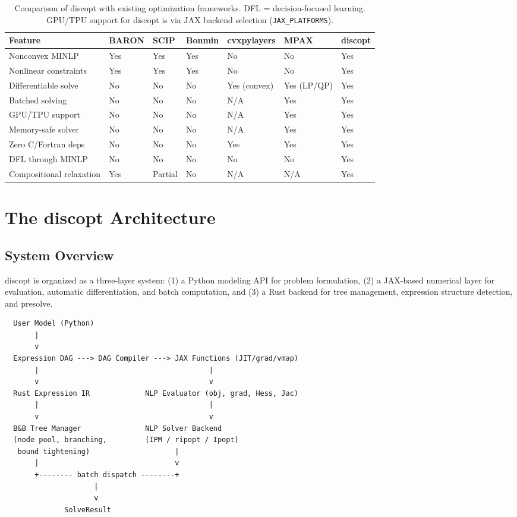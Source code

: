 \documentclass[12pt,preprint]{article}
\begin{document}
\begin{table}[htbp]
\centering
\begin{tabular}{lllllll}
\toprule
Feature & BARON & SCIP & Bonmin & cvxpylayers & MPAX & discopt \\
\midrule
Nonconvex MINLP & Yes & Yes & Yes & No & No & Yes \\
Nonlinear constraints & Yes & Yes & Yes & No & No & Yes \\
Differentiable solve & No & No & No & Yes (convex) & Yes (LP/QP) & Yes \\
Batched solving & No & No & No & N/A & Yes & Yes \\
GPU/TPU support & No & No & No & N/A & Yes & Yes \\
Memory-safe solver & No & No & No & N/A & Yes & Yes \\
Zero C/Fortran deps & No & No & No & Yes & Yes & Yes \\
DFL through MINLP & No & No & No & No & No & Yes \\
Compositional relaxation & Yes & Partial & No & N/A & N/A & Yes \\
\bottomrule
\end{tabular}
\caption{Comparison of discopt with existing optimization frameworks. DFL = decision-focused learning. GPU/TPU support for discopt is via JAX backend selection (\texttt{JAX\_PLATFORMS}).}
\label{tab-gaps}
\end{table}


\section{The discopt Architecture}
\label{org-the-discopt-architecture}
\subsection{System Overview}
\label{org-system-overview}
discopt is organized as a three-layer system: (1) a Python modeling API for problem formulation, (2) a JAX-based numerical layer for evaluation, automatic differentiation, and batch computation, and (3) a Rust backend for tree management, expression structure detection, and presolve.


\begin{verbatim}
  User Model (Python)
       |
       v
  Expression DAG ---> DAG Compiler ---> JAX Functions (JIT/grad/vmap)
       |                                        |
       v                                        v
  Rust Expression IR             NLP Evaluator (obj, grad, Hess, Jac)
       |                                        |
       v                                        v
  B&B Tree Manager               NLP Solver Backend
  (node pool, branching,         (IPM / ripopt / Ipopt)
   bound tightening)                    |
       |                                v
       +-------- batch dispatch --------+
                     |
                     v
              SolveResult
\end{verbatim}
\end{document}
